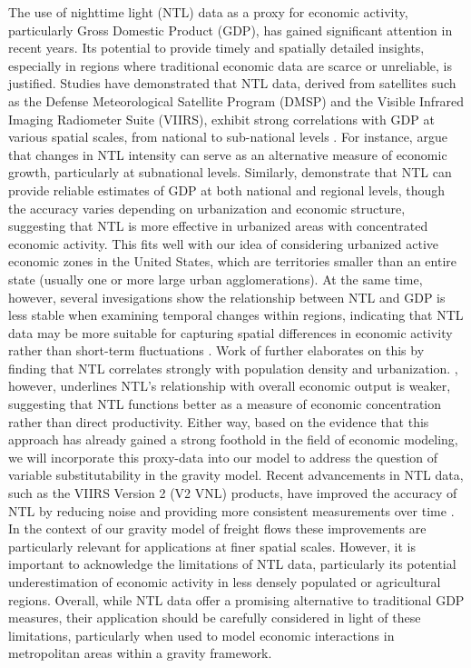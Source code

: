The use of nighttime light (NTL) data as a proxy for economic activity, particularly Gross Domestic Product (GDP), has gained significant attention in recent years. Its potential to provide timely and spatially detailed insights, especially in regions where traditional economic data are scarce or unreliable, is justified. Studies have demonstrated that NTL data, derived from satellites such as the Defense Meteorological Satellite Program (DMSP) and the Visible Infrared Imaging Radiometer Suite (VIIRS), exhibit strong correlations with GDP at various spatial scales, from national to sub-national levels \parencite{henderson2012measuring, addison2015nighttime, bickenbach2016night, gibson2021nighttime}. For instance, \textcite{henderson2012measuring} argue that changes in NTL intensity can serve as an alternative measure of economic growth, particularly at subnational levels. Similarly, \textcite{sutton2007estimation} demonstrate that NTL can provide reliable estimates of GDP at both national and regional levels, though the accuracy varies depending on urbanization and economic structure, suggesting that NTL is more effective in urbanized areas with concentrated economic activity. This fits well with our idea of considering urbanized active economic zones in the United States, which are territories smaller than an entire state (usually one or more large urban agglomerations). At the same time, however, several invesigations show the relationship between NTL and GDP is less stable when examining temporal changes within regions, indicating that NTL data may be more suitable for capturing spatial differences in economic activity rather than short-term fluctuations \parencite{bickenbach2016night, gibson2021nighttime}. Work of \textcite{mellander2015night} further elaborates on this by finding that NTL correlates strongly with population density and urbanization. \textcite{mellander2015night}, however, underlines NTL's relationship with overall economic output is weaker, suggesting that NTL functions better as a measure of economic concentration rather than direct productivity. Either way, based on the evidence that this approach has already gained a strong foothold in the field of economic modeling, we will incorporate this proxy-data into our model to address the question of variable substitutability in the gravity model. Recent advancements in NTL data, such as the VIIRS Version 2 (V2 VNL) products, have improved the accuracy of NTL by reducing noise and providing more consistent measurements over time \parencite{gibson2021nighttime}.  In the context of our gravity model of freight flows these improvements are particularly relevant for applications at finer spatial scales. However, it is important to acknowledge the limitations of NTL data, particularly its potential underestimation of economic activity in less densely populated or agricultural regions. Overall, while NTL data offer a promising alternative to traditional GDP measures, their application should be carefully considered in light of these limitations, particularly when used to model economic interactions in metropolitan areas within a gravity framework.

